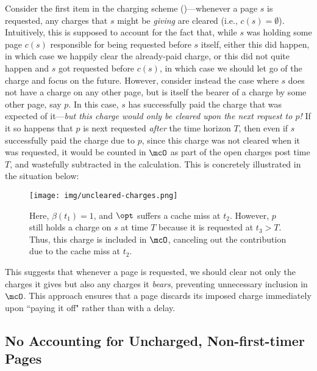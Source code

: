 \documentclass[11pt]{article}
\begin{document}
Consider the first item in the charging scheme ()---whenever a page $s$ is requested, any charges that $s$ might be \textit{giving} are cleared (i.e., $c(s)=\emptyset$). Intuitively, this is supposed to account for the fact that, while $s$ was holding some page $c(s)$ responsible for being requested before $s$ itself, either this did happen, in which case we happily clear the already-paid charge, or this did not quite happen and $s$ got requested before $c(s)$, in which case we should let go of the charge and focus on the future. However, consider instead the case where $s$ does not have a charge on any other page, but is itself the bearer of a charge by some other page, say $p$. In this case, $s$ has successfully paid the charge that was expected of it---\textit{but this charge would only be cleared upon the next request to $p$!} If it so happens that $p$ is next requested \textit{after} the time horizon $T$, then even if $s$ successfully paid the charge due to $p$, since this charge was not cleared when it was requested, it would be counted in $\mcO$ as part of the open charges post time $T$, and wastefully subtracted in the calculation. This is concretely illustrated in the situation below:
\begin{figure}[H]
    \centering
    \texttt{[image: img/uncleared-charges.png]}
    \caption{Here, $\beta(t_1)=1$, and $\opt$ suffers a cache miss at $t_2$. However, $p$ still holds a charge on $s$ at time $T$ because it is requested at $t_3 > T$. Thus, this charge is included in $\mcO$, canceling out the contribution due to the cache miss at $t_2$.}
    \label{fig:uncleared-charges}
\end{figure}
This suggests that whenever a page is requested, we should clear not only the charges it gives but also any charges it {\em bears}, preventing unnecessary inclusion in $\mcO$. This approach ensures that a page discards its imposed charge immediately upon ``paying it off" rather than with a delay.

\subsection{No Accounting for Uncharged, Non-first-timer Pages}
\label{sec:looseness-uncharged-non-first-time}
\end{document}
